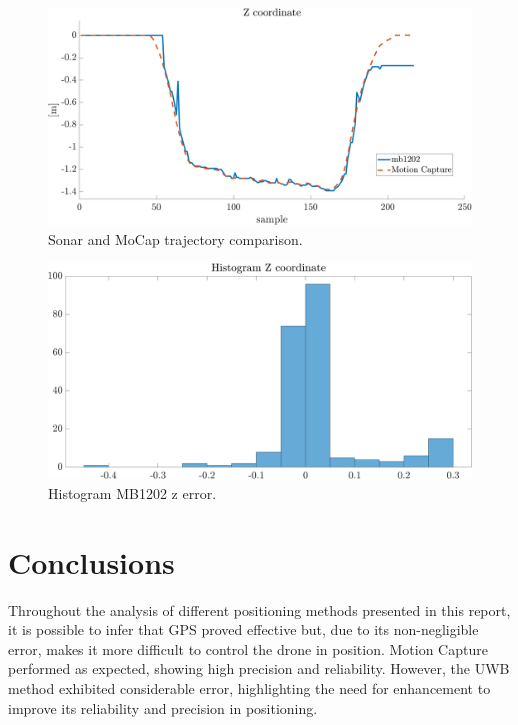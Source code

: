 \documentclass[journal]{IEEEtran}
\begin{document}
\begin{figure}
    \centering
    \includegraphics[scale=0.22]{Images/mb1202_filtered.png}
    \caption{Sonar and MoCap trajectory comparison.}
    \label{fig:mb1202_traj}
\end{figure}

\begin{figure}
    \centering
    \includegraphics[scale=0.22]{Images/z_hist_mb1202.png}
    \caption{Histogram MB1202 z error.}
    \label{fig:hist_z}
\end{figure}


\section{Conclusions}

Throughout the analysis of different positioning methods presented in this report, it is possible to infer that GPS proved effective but, due to its non-negligible error, makes it more difficult to control the drone in position. Motion Capture performed as expected, showing high precision and reliability. However, the UWB method exhibited considerable error, highlighting the need for enhancement to improve its reliability and precision in positioning. 
\end{document}
